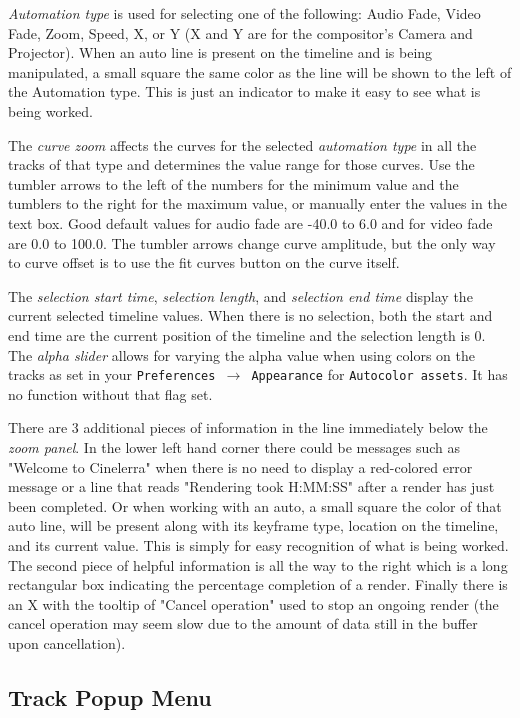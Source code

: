 \emph{Automation type} is used for selecting one of the following: Audio Fade, Video Fade, Zoom, Speed, X, or Y (X and Y are for the compositor's Camera and Projector).  When an auto line is present on
the timeline and is being manipulated, a small square the same color as the line will be shown to 
the left of the Automation type.  This is just an indicator to make it easy to see what is being worked.
 
The \emph{curve zoom} affects the curves for the selected \emph{automation type} in all the tracks of that type and determines the value range for those curves. 
Use the tumbler arrows to the left of the numbers for the minimum value and the tumblers to the right for the maximum value, or manually enter the values in the text box. 
Good default values for audio fade are -40.0 to 6.0 and for video fade are 0.0 to 100.0. 
The tumbler arrows change curve amplitude, but the only way to curve offset is to use the fit curves button on the curve itself.

The \emph{selection start time}, \emph{selection length}, and \emph{selection end time} display the current selected timeline values. When there is no selection, both the start and end time are the current
position of the timeline and the selection length is 0.
The \emph{alpha slider} allows for varying the alpha value when using colors on the tracks as set in your \texttt{Preferences $\rightarrow$ Appearance} for \texttt{Autocolor assets}.  
It has no function without that flag set.

There are 3 additional pieces of information in the line immediately below the \textit{zoom panel}.
In the lower left hand corner there could be messages such as "Welcome to Cinelerra" when there is no 
need to display a red-colored error message or a line that reads "Rendering took H:MM:SS" after a render
has just been completed. Or when working with an auto, a small square the color of that auto line, will be
present along with its keyframe type, location on the timeline, and its current value.  This is simply
for easy recognition of what is being worked. The second piece of helpful information is all the way to
the right which is a long rectangular box indicating the percentage completion of a render. Finally
there is an X with the tooltip of "Cancel operation" used to stop an ongoing render
(the cancel operation may seem slow due to the amount of data still in the buffer upon cancellation).

\subsection{Track Popup Menu}%
\label{sub:track_popup_menu}

